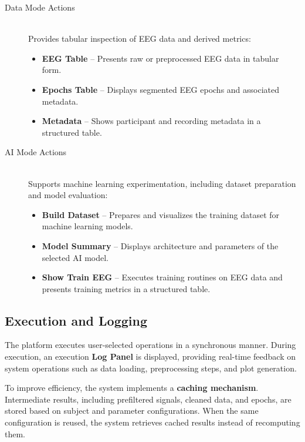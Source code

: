 \begin{description}
    \item[Data Mode Actions] \hfill \\
    Provides tabular inspection of EEG data and derived metrics:
    \begin{itemize}
        \item \textbf{EEG Table} – Presents raw or preprocessed EEG data in tabular form.
        \item \textbf{Epochs Table} – Displays segmented EEG epochs and associated metadata.
        \item \textbf{Metadata} – Shows participant and recording metadata in a structured table.
    \end{itemize}

    \item[AI Mode Actions] \hfill \\
    Supports machine learning experimentation, including dataset preparation and model evaluation:
    \begin{itemize}
        \item \textbf{Build Dataset} – Prepares and visualizes the training dataset for machine learning models.
        \item \textbf{Model Summary} – Displays architecture and parameters of the selected AI model.
        \item \textbf{Show Train EEG} – Executes training routines on EEG data and presents training metrics in a structured table.
    \end{itemize}
\end{description}

\subsection{Execution and Logging}
\label{sec:execution-and-logging}

The platform executes user-selected operations in a synchronous manner. During execution, an execution \textbf{Log Panel} is displayed, providing real-time feedback on system operations such as data loading, preprocessing steps, and plot generation.

\vspace{0.5em}
To improve efficiency, the system implements a \textbf{caching mechanism}. Intermediate results, including prefiltered signals, cleaned data, and epochs, are stored based on subject and parameter configurations. When the same configuration is reused, the system retrieves cached results instead of recomputing them.


